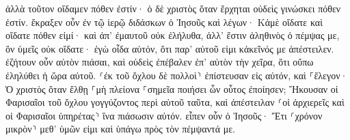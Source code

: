 \documentclass{openreader}
\begin{document}
ἀλλὰ τοῦτον οἴδαμεν πόθεν ἐστίν· ὁ δὲ χριστὸς ὅταν ἔρχηται οὐδεὶς γινώσκει πόθεν ἐστίν. 
ἔκραξεν οὖν ἐν τῷ ἱερῷ διδάσκων ὁ Ἰησοῦς καὶ λέγων· Κἀμὲ οἴδατε καὶ οἴδατε πόθεν εἰμί· καὶ ἀπ’ ἐμαυτοῦ οὐκ ἐλήλυθα, ἀλλ’ ἔστιν ἀληθινὸς ὁ πέμψας με, ὃν ὑμεῖς οὐκ οἴδατε· 
ἐγὼ οἶδα αὐτόν, ὅτι παρ’ αὐτοῦ εἰμι κἀκεῖνός με ἀπέστειλεν. 
ἐζήτουν οὖν αὐτὸν πιάσαι, καὶ οὐδεὶς ἐπέβαλεν ἐπ’ αὐτὸν τὴν χεῖρα, ὅτι οὔπω ἐληλύθει ἡ ὥρα αὐτοῦ. 
⸂ἐκ τοῦ ὄχλου δὲ πολλοὶ⸃ ἐπίστευσαν εἰς αὐτόν, καὶ ⸀ἔλεγον· Ὁ χριστὸς ὅταν ἔλθῃ ⸀μὴ πλείονα ⸀σημεῖα ποιήσει ὧν οὗτος ἐποίησεν; 
Ἤκουσαν οἱ Φαρισαῖοι τοῦ ὄχλου γογγύζοντος περὶ αὐτοῦ ταῦτα, καὶ ἀπέστειλαν ⸂οἱ ἀρχιερεῖς καὶ οἱ Φαρισαῖοι ὑπηρέτας⸃ ἵνα πιάσωσιν αὐτόν. 
εἶπεν οὖν ὁ Ἰησοῦς· Ἔτι ⸂χρόνον μικρὸν⸃ μεθ’ ὑμῶν εἰμι καὶ ὑπάγω πρὸς τὸν πέμψαντά με. 
\end{document}
